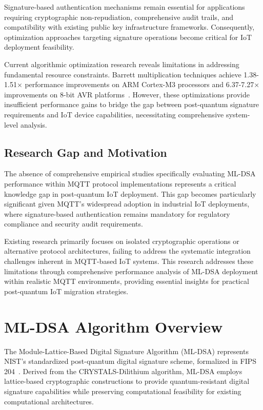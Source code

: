 \documentclass[journal=tches,final]{iacrtrans}
\begin{document}
Signature-based authentication mechanisms remain essential for applications requiring cryptographic non-repudiation, comprehensive audit trails, and compatibility with existing public key infrastructure frameworks. Consequently, optimization approaches targeting signature operations become critical for IoT deployment feasibility.

Current algorithmic optimization research reveals limitations in addressing fundamental resource constraints. Barrett multiplication techniques achieve 1.38-1.51× performance improvements on ARM Cortex-M3 processors and 6.37-7.27× improvements on 8-bit AVR platforms~\cite{Barrett2023}. However, these optimizations provide insufficient performance gains to bridge the gap between post-quantum signature requirements and IoT device capabilities, necessitating comprehensive system-level analysis.

\subsection{Research Gap and Motivation}

The absence of comprehensive empirical studies specifically evaluating ML-DSA performance within MQTT protocol implementations represents a critical knowledge gap in post-quantum IoT deployment. This gap becomes particularly significant given MQTT's widespread adoption in industrial IoT deployments, where signature-based authentication remains mandatory for regulatory compliance and security audit requirements.

Existing research primarily focuses on isolated cryptographic operations or alternative protocol architectures, failing to address the systematic integration challenges inherent in MQTT-based IoT systems. This research addresses these limitations through comprehensive performance analysis of ML-DSA deployment within realistic MQTT environments, providing essential insights for practical post-quantum IoT migration strategies.

\color{blue}

\section{ML-DSA Algorithm Overview}\label{sec:mldsa}

The Module-Lattice-Based Digital Signature Algorithm (ML-DSA) represents NIST's standardized post-quantum digital signature scheme, formalized in FIPS 204~\cite{NIST-FIPS-204}. Derived from the CRYSTALS-Dilithium algorithm, ML-DSA employs lattice-based cryptographic constructions to provide quantum-resistant digital signature capabilities while preserving computational feasibility for existing computational architectures.
\end{document}
